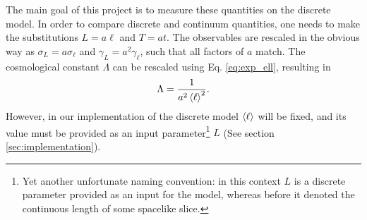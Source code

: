The main goal of this project is to measure these quantities on the discrete model. In order to compare discrete and continuum quantities, one needs to make the substitutions $L = a \ell$ and $T = a t$. The observables are rescaled in the obvious way as $\sigma_L = a \sigma_\ell$ and $\gamma_L = a^2 \gamma_\ell$, such that all factors of $a$ match. The cosmological constant $\Lambda$ can be rescaled using Eq. \eqref{eq:exp_ell}, resulting in
\begin{equation}
    \Lambda = \frac{1}{a^2 \ev{\ell}^2}
    .
\end{equation}
However, in our implementation of the discrete model $\ev{\ell}$ will be fixed, and its value must be provided as an input parameter\footnote{Yet another unfortunate naming convention: in this context $L$ is a discrete parameter provided as an input for the model, whereas before it denoted the continuous length of some spacelike slice.} $L$ (See section \ref{sec:implementation}).
